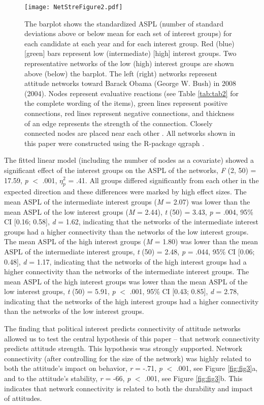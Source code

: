 \documentclass[10pt]{article}
\begin{document}
\begin{multicols}{2}
\begin{figure*}[]
    \centering
\texttt{[image: NetStreFigure2.pdf]}
\caption{The barplot shows the standardized ASPL (number of standard deviations above or below mean for each set of interest groups) for each candidate at each year and for each interest group. Red (blue) [green] bars represent low (intermediate) [high] interest groups. Two representative networks of the low (high) interest groups are shown above (below) the barplot. The left (right) networks represent attitude networks toward Barack Obama (George W. Bush) in 2008 (2004). Nodes represent evaluative reactions (see Table \ref{tab:tab2} for the complete wording of the items), green lines represent positive connections, red lines represent negative connections, and thickness of an edge represents the strength of the connection. Closely connected nodes are placed near each other \protect\cite{Fruchterman1991}. All networks shown in this paper were constructed using the R-package qgraph \protect\cite{Epskamp2012}.}

\label{fig:fig2}
\end{figure*}

The fitted linear model (including the number of nodes as a covariate) showed a significant effect of the interest groups on the ASPL of the networks, \textit{F} (2, 50) = 17.59, \textit{p} $<$ .001, \textit{$\eta_p^2$} = .41. All groups differed significantly from each other in the expected direction and these differences were marked by high effect sizes. The mean ASPL of the intermediate interest groups (\textit{M} = 2.07) was lower than the mean ASPL of the low interest groups (\textit{M} = 2.44), \textit{t} (50) = 3.43, \textit{p} = .004, 95\% CI [0.16; 0.58], \textit{d} = 1.62, indicating that the networks of the intermediate interest groups had a higher connectivity than the networks of the low interest groups. The mean ASPL of the high interest groups (\textit{M} = 1.80) was lower than the mean ASPL of the intermediate interest groups, \textit{t} (50) = 2.48, \textit{p} = .044, 95\% CI [0.06; 0.48], \textit{d} = 1.17, indicating that the networks of the high interest groups had a higher connectivity than the networks of the intermediate interest groups. The mean ASPL of the high interest groups was lower than the mean ASPL of the low interest groups, \textit{t} (50) = 5.91, \textit{p} $<$ .001, 95\% CI [0.43; 0.85], \textit{d} = 2.78, indicating that the networks of the high interest groups had a higher connectivity than the networks of the low interest groups.\par
The finding that political interest predicts connectivity of attitude networks allowed us to test the central hypothesis of this paper -- that network connectivity predicts attitude strength. This hypothesis was strongly supported. Network connectivity (after controlling for the size of the network) was highly related to both the attitude's impact on behavior, \textit{r} = -.71, \textit{p} $<$ .001, see Figure \ref{fig:fig3}a, and to the attitude's stability, \textit{r} = -66, \textit{p} $<$ .001, see Figure \ref{fig:fig3}b. This indicates that network connectivity is related to both the durability and impact of attitudes.


\end{multicols}
\end{document}
